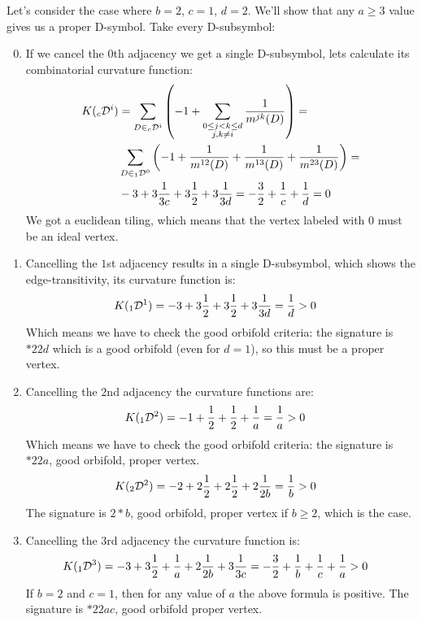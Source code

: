 \documentclass[12pt,a4paper]{article}
\newcommand{\leftsub}[2]{{\vphantom{#2}}_{#1}{#2}}
\theoremstyle{plain}%
\theoremstyle{definition}
\theoremstyle{remark}
\begin{document}
Let's consider the case where $b=2$, $c=1$, $d=2$. We'll show that any $a\geq3$ value
gives us a proper D-symbol. Take every D-subsymbol:
\begin{enumerate}
  \setcounter{enumi}{-1}
  \item If we cancel the $0$th adjacency we get a single D-subsymbol, lets
    calculate its combinatorial curvature function:
    \begin{align*}
      K(\leftsub{c}{\mathcal{D}^i})&=\sum_{D\in
      \leftsub{c}{\mathcal{D}^i}}\left(-1+\sum_{\substack{0\le j<k\le d \\ j,k\ne i}}\frac{1}{m^{jk}(D)}\right)= \\
      &
      \sum_{D\in\leftsub{1}{\mathcal{D}^0}}\left(-1+\frac{1}{m^{12}(D)}+\frac{1}{m^{13}(D)}+\frac{1}{m^{23}(D)}\right)= \\
      & -3 + 3\frac{1}{3c} + 3\frac{1}{2} + 3\frac{1}{3d} = -\frac{3}{2}+\frac{1}{c}+\frac{1}{d} = 0
    \end{align*}
    We got a euclidean tiling, which means that the vertex labeled with $0$ must
    be an ideal vertex.
  \item Cancelling the $1$st adjacency results in a single D-subsymbol, which
    shows the edge-transitivity, its curvature function is:
    \begin{align*}
      K(\leftsub{1}{\mathcal{D}^1})&= -3 + 3\frac{1}{2} + 3\frac{1}{2} +
      3\frac{1}{3d} = \frac{1}{d} > 0
    \end{align*}
    Which means we have to check the good orbifold criteria: the signature is
    $*22d$ which is a good orbifold (even for $d=1$), so this must be a proper vertex.
  \item Cancelling the $2$nd adjacency the curvature functions are:
    \begin{align*}
      K(\leftsub{1}{\mathcal{D}^2})&= -1 + \frac{1}{2} + \frac{1}{2} +
      \frac{1}{a} = \frac{1}{a} > 0
    \end{align*}
    Which means we have to check the good orbifold criteria: the signature is
    $*22a$, good orbifold, proper vertex.
    \begin{align*}
      K(\leftsub{2}{\mathcal{D}^2})&= -2 + 2\frac{1}{2} + 2\frac{1}{2} +
      2\frac{1}{2b} = \frac{1}{b} > 0
    \end{align*}
    The signature is $2*b$, good orbifold, proper vertex if $b\geq2$, which is
    the case.
  \item Cancelling the $3$rd adjacency the curvature function is:
    \begin{align*}
      K(\leftsub{1}{\mathcal{D}^3})&= -3 + 3\frac{1}{2} + \frac{1}{a} +
      2\frac{1}{2b} + 3\frac{1}{3c} =
       -\frac{3}{2} + \frac{1}{b} + \frac{1}{c} + \frac{1}{a} > 0
    \end{align*}
    If $b=2$ and $c=1$, then for any value of $a$ the above formula is positive.
    The signature is $*22ac$, good orbifold proper vertex.
\end{enumerate}
\end{document}
